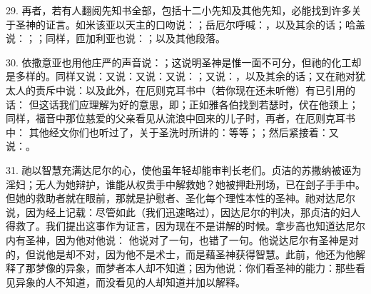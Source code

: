 29. 再者，若有人翻阅先知书全部，包括十二小先知及其他先知，必能找到许多关于圣神的证言。如米该亚以天主的口吻说：；岳厄尔呼喊：，以及其余的话；哈盖说：；；同样，匝加利亚也说：；以及其他段落。\par

30. 依撒意亚也用他庄严的声音说：；这说明圣神是惟一面不可分，但祂的化工却是多样的。同样又说：又说：又说：又说：；又说：，以及其余的话；又在祂对犹太人的责斥中说：以及此外，在厄则克耳书中（若你现在还未听倦）有已引用的话： 但这话我们应理解为好的意思，即；正如雅各伯找到若瑟时，伏在他颈上；同样，福音中那位慈爱的父亲看见从流浪中回来的儿子时，再者，在厄则克耳书中： 其他经文你们也听过了，关于圣洗时所讲的：等等；；然后紧接着：又说：。\par

31. 祂以智慧充满达尼尔的心，使他虽年轻却能审判长老们。贞洁的苏撒纳被诬为淫妇；无人为她辩护，谁能从权贵手中解救她？她被押赴刑场，已在刽子手手中。但她的救助者就在眼前，那就是护慰者、圣化每个理性本性的圣神。祂对达尼尔说，因为经上记载：尽管如此（我们迅速略过），因达尼尔的判决，那贞洁的妇人得救了。我们提出这事作为证言，因为现在不是讲解的时候。拿步高也知道达尼尔内有圣神，因为他对他说： 他说对了一句，也错了一句。他说达尼尔有圣神是对的，但说他是却不对，因为他不是术士，而是藉圣神获得智慧。此前，他还为他解释了那梦像的异象，而梦者本人却不知道；因为他说：你们看圣神的能力：那些看见异象的人不知道，而没看见的人却知道并加以解释。\par

